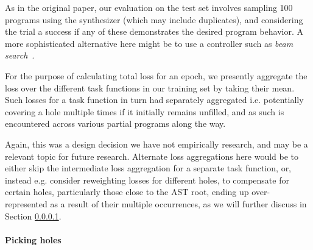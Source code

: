 \documentclass{article}
\begin{document}
As in the original paper,
our evaluation on the test set involves sampling 100 programs using the synthesizer (which may include duplicates),
and considering the trial a success if any of these demonstrates the desired program behavior.
A more sophisticated alternative here might be to use a controller such as \emph{beam search}~\citep{polosukhin2018neural}.


For the purpose of calculating total loss for an epoch,
we presently aggregate the loss over the different
task functions in our training set by taking their mean.
Such losses for a task function in turn had separately aggregated
i.e. potentially covering a hole multiple times if it initially remains unfilled,
and as such is encountered across various partial programs along the way.

Again, this was a design decision we have not empirically research,
and may be a relevant topic for future research.
Alternate loss aggregations here would be to either
skip the intermediate loss aggregation for a separate task function,
or, instead e.g. consider reweighting losses for different holes,
to compensate for certain holes, particularly those close to the AST root,
ending up over-represented as a result of their multiple occurrences,
as we will further discuss in Section \ref{sec:picking}.

\paragraph{Picking holes} \label{sec:picking}
\end{document}
